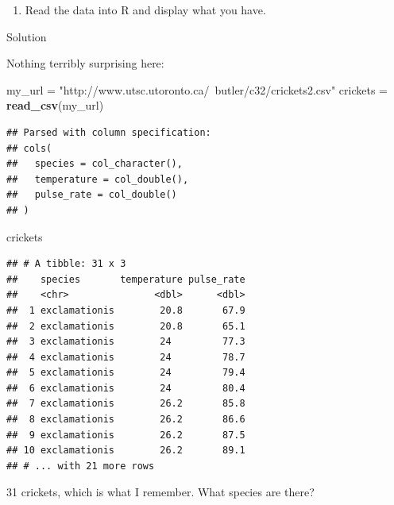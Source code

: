 \documentclass[]{tufte-book}
\newenvironment{Shaded}{}{}
\newcommand{\KeywordTok}[1]{\textcolor[rgb]{0.00,0.44,0.13}{\textbf{#1}}}
\newcommand{\NormalTok}[1]{#1}
\newcommand{\OperatorTok}[1]{\textcolor[rgb]{0.40,0.40,0.40}{#1}}
\newcommand{\StringTok}[1]{\textcolor[rgb]{0.25,0.44,0.63}{#1}}
\providecommand{\tightlist}{%
  \setlength{\itemsep}{0pt}\setlength{\parskip}{0pt}}
\theoremstyle{definition}
\theoremstyle{definition}
\theoremstyle{definition}
\theoremstyle{remark}
\begin{document}
\begin{enumerate}
\def\labelenumi{(\alph{enumi})}
\tightlist
\item
  Read the data into R and display what you have.
\end{enumerate}

Solution

Nothing terribly surprising here:

\begin{Shaded}
\begin{Highlighting}[]
\NormalTok{my_url =}\StringTok{ "http://www.utsc.utoronto.ca/~butler/c32/crickets2.csv"}
\NormalTok{crickets =}\StringTok{ }\KeywordTok{read_csv}\NormalTok{(my_url)}
\end{Highlighting}
\end{Shaded}

\begin{verbatim}
## Parsed with column specification:
## cols(
##   species = col_character(),
##   temperature = col_double(),
##   pulse_rate = col_double()
## )
\end{verbatim}

\begin{Shaded}
\begin{Highlighting}[]
\NormalTok{crickets}
\end{Highlighting}
\end{Shaded}

\begin{verbatim}
## # A tibble: 31 x 3
##    species       temperature pulse_rate
##    <chr>               <dbl>      <dbl>
##  1 exclamationis        20.8       67.9
##  2 exclamationis        20.8       65.1
##  3 exclamationis        24         77.3
##  4 exclamationis        24         78.7
##  5 exclamationis        24         79.4
##  6 exclamationis        24         80.4
##  7 exclamationis        26.2       85.8
##  8 exclamationis        26.2       86.6
##  9 exclamationis        26.2       87.5
## 10 exclamationis        26.2       89.1
## # ... with 21 more rows
\end{verbatim}

31 crickets, which is what I remember. What species are there?

\begin{Shaded}
\end{Shaded}
\end{document}
